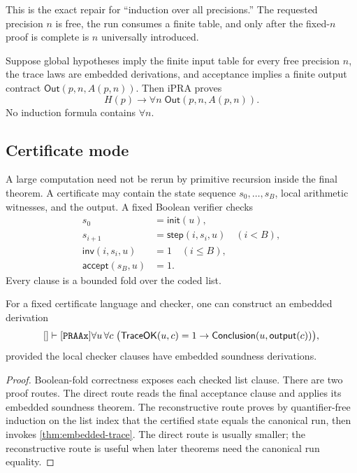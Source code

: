 This is the exact repair for ``induction over all precisions.''  The requested
precision \(n\) is free, the run consumes a finite table, and only after the
fixed-\(n\) proof is complete is \(n\) universally introduced.

\begin{corollary}
\label{cor:fix-precision}
Suppose global hypotheses imply the finite input table for every free precision
\(n\), the trace laws are embedded derivations, and acceptance implies a finite
output contract \(\mathsf{Out}(p,n,A(p,n))\).  Then iPRA proves
\[
 H(p)\to\forall n\;\mathsf{Out}(p,n,A(p,n)).
\]
No induction formula contains \(\forall n\).
\end{corollary}

\subsection{Certificate mode}

A large computation need not be rerun by primitive recursion inside the final
theorem.  A certificate may contain the state sequence
\(s_0,\ldots,s_B\), local arithmetic witnesses, and the output.  A fixed
Boolean verifier checks
\begin{align*}
 s_0&=\mathsf{init}(u),\\
 s_{i+1}&=\mathsf{step}(i,s_i,u)\quad(i<B),\\
 \mathsf{inv}(i,s_i,u)&=1\quad(i\le B),\\
 \mathsf{accept}(s_B,u)&=1.
\end{align*}
Every clause is a bounded fold over the coded list.

\begin{theorem}
\label{thm:certificate-reflection}
For a fixed certificate language and checker, one can construct an embedded
derivation
\[
 []\vdash[\texttt{PRAAx}]\forall u\,\forall c\;
 \bigl(\mathsf{TraceOK}(u,c)=1\to
       \mathsf{Conclusion}(u,\mathsf{output}(c))\bigr),
\]
provided the local checker clauses have embedded soundness derivations.
\end{theorem}

\begin{proof}
Boolean-fold correctness exposes each checked list clause.  There are two
proof routes.  The direct route reads the final acceptance clause and applies
its embedded soundness theorem.  The reconstructive route proves by
quantifier-free induction on the list index that the certified state equals the
canonical run, then invokes \cref{thm:embedded-trace}.  The direct route is
usually smaller; the reconstructive route is useful when later theorems need
the canonical run equality.
\end{proof}

